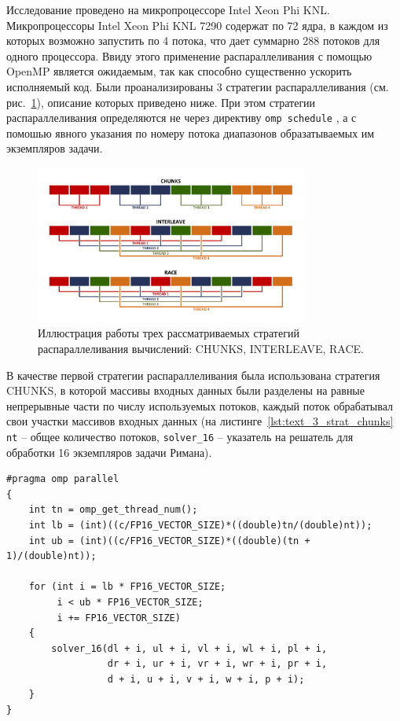 Исследование проведено на микропроцессоре Intel Xeon Phi KNL\label{abbr:knl3}.
Микропроцессоры Intel Xeon Phi KNL 7290 содержат по 72 ядра, в каждом из которых возможно запустить  по 4 потока, что дает суммарно 288 потоков для одного процессора.
Ввиду этого применение распараллеливания с помощью OpenMP является ожидаемым, так как способно существенно ускорить исполняемый код.
Были проанализированы 3 стратегии распараллеливания (см. рис.~\ref{fig:text_3_omp1_modes}), описание которых приведено ниже.
При этом стратегии распараллеливания определяются не через директиву \texttt{omp schedule} \cite{Ciorba2018OMPSchedule,Mohammed2022Schedule}, а с помошью явного указания по номеру потока диапазонов образатываемых им экземпляров задачи.

\begin{figure}[ht]
\centering
\includegraphics[width=0.8\textwidth]{./pics/text_3_omp1/modes.pdf}
\singlespacing
{}\caption{Иллюстрация работы трех рассматриваемых стратегий распараллеливания вычислений: CHUNKS\label{term:parallel_strategy_chunks}, INTERLEAVE\label{term:parallel_strategy_interleave}, RACE\label{term:parallel_strategy_race}.}
\label{fig:text_3_omp1_modes}
\end{figure}

В качестве первой стратегии распараллеливания была использована стратегия CHUNKS, в которой массивы входных данных были разделены на равные непрерывные части по числу используемых потоков, каждый поток обрабатывал свои участки массивов входных данных (на листинге~\ref{lst:text_3_strat_chunks} \texttt{nt} -- общее количество потоков, \texttt{solver\_16} -- указатель на решатель для обработки 16 экземпляров задачи Римана).

\begin{singlespace}
\begin{lstlisting}[caption={Распараллеливание римановского решателя с помощью стратегии CHUNKS.},label={lst:text_3_strat_chunks}]
#pragma omp parallel
{
    int tn = omp_get_thread_num();
    int lb = (int)((c/FP16_VECTOR_SIZE)*((double)tn/(double)nt));
    int ub = (int)((c/FP16_VECTOR_SIZE)*((double)(tn + 1)/(double)nt));

    for (int i = lb * FP16_VECTOR_SIZE;
         i < ub * FP16_VECTOR_SIZE;
         i += FP16_VECTOR_SIZE)
    {
        solver_16(dl + i, ul + i, vl + i, wl + i, pl + i,
                  dr + i, ur + i, vr + i, wr + i, pr + i,
                  d + i, u + i, v + i, w + i, p + i);
    }
}
\end{lstlisting}
\end{singlespace}

